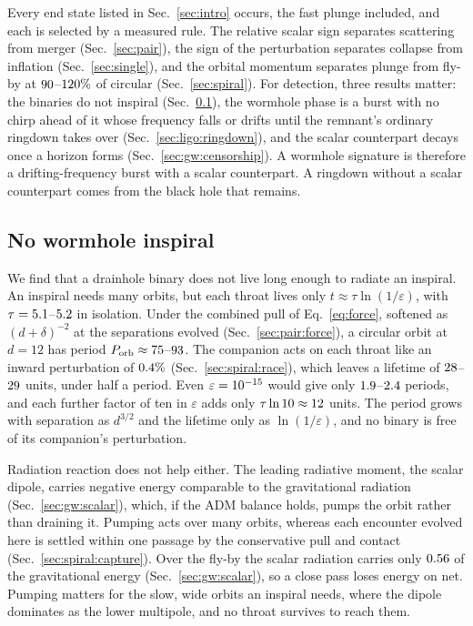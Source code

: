 \documentclass[twocolumn,floatfix,aps,prd,superscriptaddress,nofootinbib,showkeys]{revtex4-2}
\begin{document}
Every end state listed in Sec.~\ref{sec:intro} occurs, the fast plunge included, and each is selected by a measured rule. The relative scalar sign separates scattering from merger (Sec.~\ref{sec:pair}), the sign of the perturbation separates collapse from inflation (Sec.~\ref{sec:single}), and the orbital momentum separates plunge from fly-by at $90$--$120\%$ of circular (Sec.~\ref{sec:spiral}). For detection, three results matter: the binaries do not inspiral (Sec.~\ref{sec:discussion:noinspiral}), the wormhole phase is a burst with no chirp ahead of it whose frequency falls or drifts until the remnant's ordinary ringdown takes over (Sec.~\ref{sec:ligo:ringdown}), and the scalar counterpart decays once a horizon forms (Sec.~\ref{sec:gw:censorship}). A wormhole signature is therefore a drifting-frequency burst with a scalar counterpart. A ringdown without a scalar counterpart comes from the black hole that remains.

\subsection{No wormhole inspiral}
\label{sec:discussion:noinspiral}

We find that a drainhole binary does not live long enough to radiate an inspiral. An inspiral needs many orbits, but each throat lives only $t\approx\tau\ln(1/\varepsilon)$, with $\tau=5.1$--$5.2$ in isolation. Under the combined pull of Eq.~\eqref{eq:force}, softened as $(d+\delta)^{-2}$ at the separations evolved (Sec.~\ref{sec:pair:force}), a circular orbit at $d=12$ has period $P_{\rm orb}\approx75$--$93$. The companion acts on each throat like an inward perturbation of $0.4\%$ (Sec.~\ref{sec:spiral:race}), which leaves a lifetime of $28$--$29$ units, under half a period. Even $\varepsilon=10^{-15}$ would give only $1.9$--$2.4$ periods, and each further factor of ten in $\varepsilon$ adds only $\tau\ln10\approx12$ units. The period grows with separation as $d^{3/2}$ and the lifetime only as $\ln(1/\varepsilon)$, and no binary is free of its companion's perturbation.

Radiation reaction does not help either. The leading radiative moment, the scalar dipole, carries negative energy comparable to the gravitational radiation (Sec.~\ref{sec:gw:scalar}), which, if the ADM balance holds, pumps the orbit rather than draining it. Pumping acts over many orbits, whereas each encounter evolved here is settled within one passage by the conservative pull and contact (Sec.~\ref{sec:spiral:capture}). Over the fly-by the scalar radiation carries only $0.56$ of the gravitational energy (Sec.~\ref{sec:gw:scalar}), so a close pass loses energy on net. Pumping matters for the slow, wide orbits an inspiral needs, where the dipole dominates as the lower multipole, and no throat survives to reach them.
\end{document}
